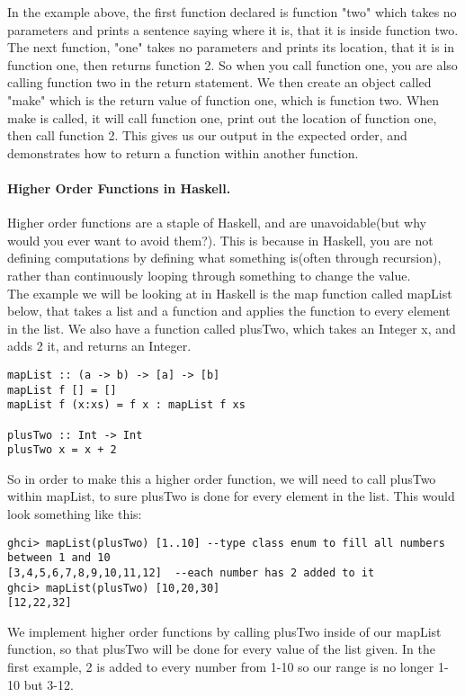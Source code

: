 \documentclass{article}
\begin{document}
In the example above, the first function declared is function "two" which takes no parameters and prints a sentence saying where it is, that it is inside function two.
The next function, "one" takes no parameters and prints its location, that it is in function one, then returns function 2. So when you call function one, you are also calling function two in the return statement. We then create an object called "make" which is the return value of function one, which is function two. When make is called, it will call function one, print out the location of function one, then call function 2. This gives us our output in the expected order, and demonstrates how to return a function within another function.



\paragraph{Higher Order Functions in Haskell.}
Higher order functions are a staple of Haskell, and are unavoidable(but why would you ever want to avoid them?). This is because in Haskell, you are not defining computations by defining what something is(often through recursion), rather than continuously looping through something to change the value.
\\
The example we will be looking at in Haskell is the map function called mapList below, that takes a list and a function and applies the function to every element in the list. We also have a function called plusTwo, which takes an Integer x, and adds 2 it, and returns an Integer.

\begin{lstlisting}
mapList :: (a -> b) -> [a] -> [b]
mapList f [] = []
mapList f (x:xs) = f x : mapList f xs

plusTwo :: Int -> Int
plusTwo x = x + 2
\end{lstlisting}
So in order to make this a higher order function, we will need to call plusTwo within mapList, to sure plusTwo is done for every element in the list. This would look something like this:
\begin{lstlisting}
ghci> mapList(plusTwo) [1..10] --type class enum to fill all numbers between 1 and 10
[3,4,5,6,7,8,9,10,11,12]  --each number has 2 added to it
ghci> mapList(plusTwo) [10,20,30]
[12,22,32]

\end{lstlisting}
We implement higher order functions by calling plusTwo inside of our mapList function, so that plusTwo will be done for every value of the list given. In the first example, 2 is added to every number from 1-10 so our range is no longer 1-10 but 3-12.
\end{document}

